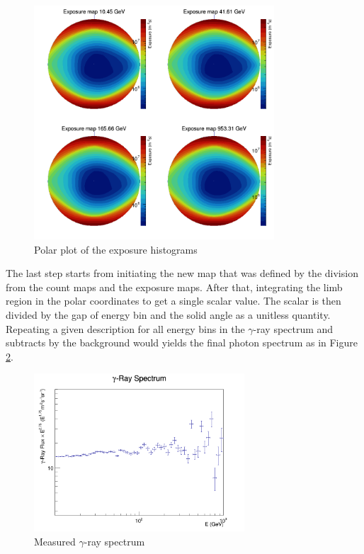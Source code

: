 \begin{figure}[h!]
    \centering
    \includegraphics[width=0.8\textwidth]{content/result_and_discussion/figures/polar_expmaps.png}
    \caption{Polar plot of the exposure histograms}
    \label{fig:expmap_polar}
\end{figure}


The last step starts from initiating the new map that was 
defined by the division from the count maps and the exposure maps.
After that, integrating the limb region in the polar coordinates
to get a single scalar value. The scalar is then divided by the 
gap of energy bin and the solid angle as a unitless quantity.
Repeating a given description for all energy bins in the $\gamma$-ray 
spectrum and subtracts by the background would yields the final 
photon spectrum as in Figure \ref{fig:flxhist}.

\begin{figure}[h!]
    \centering
    \includegraphics[width=0.7\textwidth]{content/result_and_discussion/figures/flx_hist.png}
    \caption{Measured $\gamma$-ray spectrum}
    \label{fig:flxhist}
\end{figure}


